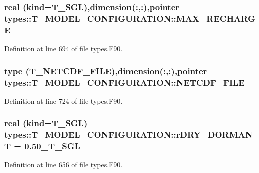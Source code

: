 \hypertarget{typetypes_1_1_t___m_o_d_e_l___c_o_n_f_i_g_u_r_a_t_i_o_n_a935886bbd346d44b21915aa6cf776cf3}{
\subsubsection[{MAX\_\-RECHARGE}]{\setlength{\rightskip}{0pt plus 5cm}real (kind={\bf T\_\-SGL}),dimension(:,:),pointer {\bf types::T\_\-MODEL\_\-CONFIGURATION::MAX\_\-RECHARGE}}}
\label{typetypes_1_1_t___m_o_d_e_l___c_o_n_f_i_g_u_r_a_t_i_o_n_a935886bbd346d44b21915aa6cf776cf3}


Definition at line 694 of file types.F90.

\hypertarget{typetypes_1_1_t___m_o_d_e_l___c_o_n_f_i_g_u_r_a_t_i_o_n_add16140ef933dff07917068a856fffde}{
\subsubsection[{NETCDF\_\-FILE}]{\setlength{\rightskip}{0pt plus 5cm}type ({\bf T\_\-NETCDF\_\-FILE}),dimension(:,:),pointer {\bf types::T\_\-MODEL\_\-CONFIGURATION::NETCDF\_\-FILE}}}
\label{typetypes_1_1_t___m_o_d_e_l___c_o_n_f_i_g_u_r_a_t_i_o_n_add16140ef933dff07917068a856fffde}


Definition at line 724 of file types.F90.

\hypertarget{typetypes_1_1_t___m_o_d_e_l___c_o_n_f_i_g_u_r_a_t_i_o_n_a9cbb49e61c26c80a977eda1cebe6ff66}{
\subsubsection[{rDRY\_\-DORMANT}]{\setlength{\rightskip}{0pt plus 5cm}real (kind={\bf T\_\-SGL}) {\bf types::T\_\-MODEL\_\-CONFIGURATION::rDRY\_\-DORMANT} = 0.50\_\-T\_\-SGL}}
\label{typetypes_1_1_t___m_o_d_e_l___c_o_n_f_i_g_u_r_a_t_i_o_n_a9cbb49e61c26c80a977eda1cebe6ff66}


Definition at line 656 of file types.F90.


